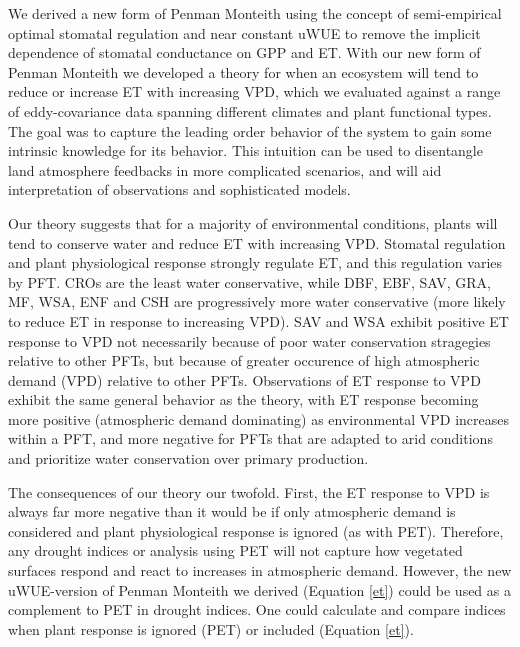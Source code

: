 \documentclass[draft,linenumbers]{agujournal}
\begin{document}
We derived a new form of Penman Monteith using the concept of semi-empirical optimal stomatal regulation \citep{Lin_2015, MEDLYN_2011} and near constant uWUE \citep{Zhou_2015} to remove the implicit dependence of stomatal conductance on GPP and ET. With our new form of Penman Monteith we developed a theory for when an ecosystem will tend to reduce or increase ET with increasing VPD, which we evaluated against a range of eddy-covariance data spanning different climates and plant functional types. The goal was to capture the leading order behavior of the system to gain some intrinsic knowledge for its behavior. This intuition can be used to disentangle land atmosphere feedbacks in more complicated scenarios, and will aid interpretation of observations and sophisticated models.

Our theory suggests that for a majority of environmental conditions, plants will tend to conserve water and reduce ET with increasing VPD. Stomatal regulation and plant physiological response strongly regulate ET, and this regulation varies by PFT. CROs are the least water conservative, while DBF, EBF, SAV, GRA, MF, WSA, ENF and CSH are progressively more water conservative (more likely to reduce ET in response to increasing VPD). SAV and WSA exhibit positive ET response to VPD not necessarily because of poor water conservation stragegies relative to other PFTs, but because of greater occurence of high atmospheric demand (VPD) relative to other PFTs. Observations of ET response to VPD exhibit the same general behavior as the theory, with ET response becoming more positive (atmospheric demand dominating) as environmental VPD increases within a PFT, and more negative for PFTs that are adapted to arid conditions and prioritize water conservation over primary production.

The consequences of our theory our twofold. First, the ET response to VPD is always far more negative than it would be if only atmospheric demand is considered and plant physiological response is ignored (as with PET). Therefore,  any drought indices or analysis using PET will not capture how  vegetated surfaces respond and react to increases in atmospheric demand. However, the new uWUE-version of Penman Monteith we derived (Equation \ref{et}) could be used as a complement to PET in drought indices. One could calculate and compare indices  when plant response is ignored (PET) or included (Equation \ref{et}). 
\end{document}
